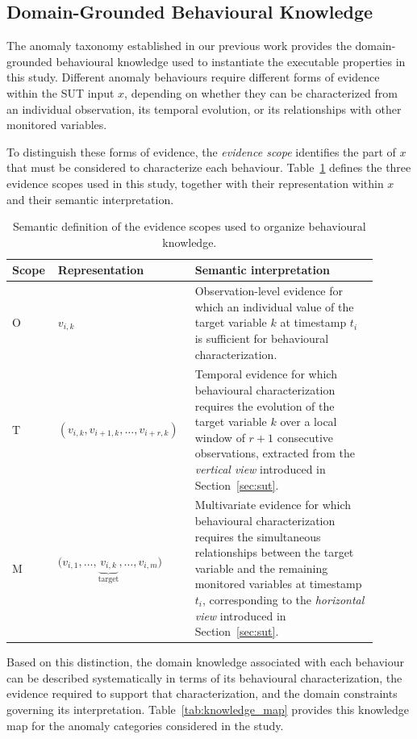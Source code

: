 \documentclass[preprint,12pt]{elsarticle}
\begin{document}
\subsection{Domain-Grounded Behavioural Knowledge}
\label{sec:behavioural_knowledge}
The anomaly taxonomy established in our previous work provides the
domain-grounded behavioural knowledge used to instantiate the executable
properties in this study. Different anomaly behaviours require different
forms of evidence within the SUT input \(x\), depending on whether they can
be characterized from an individual observation, its temporal evolution, or
its relationships with other monitored variables.

To distinguish these forms of evidence, the \emph{evidence scope} identifies
the part of \(x\) that must be considered to characterize each behaviour.
Table~\ref{tab:evidence_scope} defines the three evidence scopes used in this
study, together with their representation within \(x\) and their semantic
interpretation.

\begin{table}[t]
\caption{Semantic definition of the evidence scopes used to organize
behavioural knowledge.}
\label{tab:evidence_scope}
\centering
\scriptsize
\begin{tabular}{
>{\centering\arraybackslash}p{0.10\linewidth}
p{0.32\linewidth}
p{0.48\linewidth}
}
\hline
\textbf{Scope} &
\textbf{Representation} &
\textbf{Semantic interpretation} \\
\hline

\(\mathrm{O}\) &
\(v_{i,k}\) &
Observation-level evidence for which an individual value of the target
variable \(k\) at timestamp \(t_i\) is sufficient for behavioural
characterization. \\

\(\mathrm{T}\) &
\(\displaystyle
(v_{i,k},v_{i+1,k},\ldots,v_{i+r,k})
\) &
Temporal evidence for which behavioural characterization requires the
evolution of the target variable \(k\) over a local window of \(r+1\)
consecutive observations, extracted from the \emph{vertical view}
introduced in Section~\ref{sec:sut}. \\

\(\mathrm{M}\) &
\(\displaystyle
\bigl(
v_{i,1},\ldots,
\underbrace{v_{i,k}}_{\mathrm{target}},
\ldots,v_{i,m}
\bigr)
\) &
Multivariate evidence for which behavioural characterization requires
the simultaneous relationships between the target variable and the
remaining monitored variables at timestamp \(t_i\), corresponding to
the \emph{horizontal view} introduced in Section~\ref{sec:sut}. \\
\hline
\end{tabular}
\end{table}
Based on this distinction, the domain knowledge associated with each
behaviour can be described systematically in terms of its behavioural
characterization, the evidence required to support that characterization,
and the domain constraints governing its interpretation.
Table~\ref{tab:knowledge_map} provides this knowledge map for the anomaly
categories considered in the study.
\end{document}
